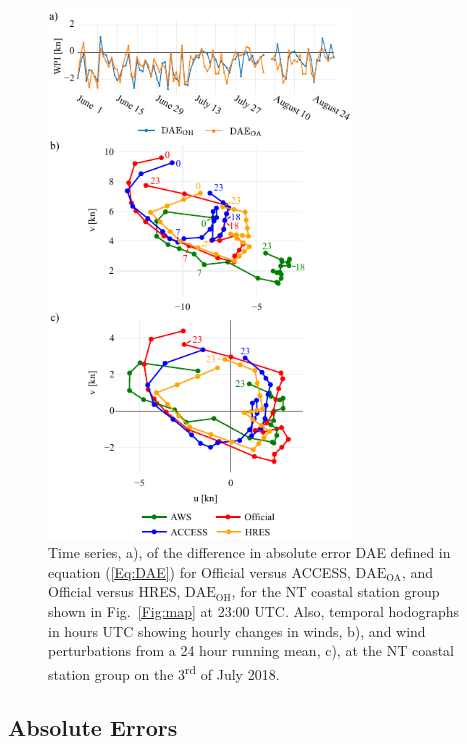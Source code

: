 \documentclass[twocol]{ametsoc}
\begin{document}
\begin{figure}
\centering
\includegraphics[width=19pc]{case_studies_nt.pdf}
\caption{Time series, a), of the difference in absolute error DAE defined in equation (\ref{Eq:DAE}) for Official versus ACCESS, $\text{DAE}_\text{OA}$, and Official versus HRES, $\text{DAE}_\text{OH}$, for the NT coastal station group shown in Fig.~\ref{Fig:map} at 23:00 UTC. Also, temporal hodographs in hours UTC showing hourly changes in winds, b), and wind perturbations from a 24 hour running mean, c), at the NT coastal station group on the 3\textsuperscript{rd} of July 2018.}
\label{Fig:case_studies_nt}
\end{figure}

\subsection{Absolute Errors}
\label{Sec:Daily}
\end{document}
